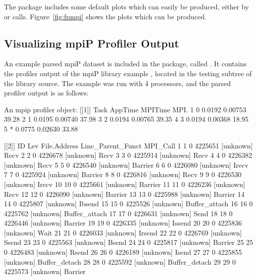 The package includes some default plots which can easily be produced, either by  or  calls.  Figure~\ref{fig:fpmpi} shows the plots which can be produced.


\subsection{Visualizing mpiP Profiler Output}

An example parsed mpiP dataset is included in the  package, called .  It contains the profiler output of the mpiP library example , located in the testing subtree of the library source.  The example was run with 4 processors, and the parsed profiler output is as follows:
\begin{Output}
An mpip profiler object:
[[1]]
  Task AppTime MPITime  MPI.
1    0  0.0192 0.00753 39.28
2    1  0.0195 0.00740 37.98
3    2  0.0194 0.00765 39.35
4    3  0.0194 0.00368 18.95
5    *  0.0775 0.02630 33.88

[[2]]
   ID Lev File.Address Line_Parent_Funct      MPI_Call
1   1   0      4225651         [unknown]          Recv
2   2   0      4226678         [unknown]          Recv
3   3   0      4225914         [unknown]          Recv
4   4   0      4226382         [unknown]          Recv
5   5   0      4226540         [unknown]       Barrier
6   6   0      4226080         [unknown]         Irecv
7   7   0      4225924         [unknown]       Barrier
8   8   0      4226816         [unknown]          Recv
9   9   0      4226530         [unknown]         Irecv
10 10   0      4225661         [unknown]       Barrier
11 11   0      4226236         [unknown]          Recv
12 12   0      4226090         [unknown]       Barrier
13 13   0      4225988         [unknown]       Barrier
14 14   0      4225807         [unknown]        Ibsend
15 15   0      4225526         [unknown] Buffer_attach
16 16   0      4225762         [unknown] Buffer_attach
17 17   0      4226631         [unknown]          Send
18 18   0      4226446         [unknown]       Barrier
19 19   0      4226335         [unknown]        Issend
20 20   0      4225836         [unknown]          Wait
21 21   0      4226033         [unknown]        Irsend
22 22   0      4226769         [unknown]         Ssend
23 23   0      4225563         [unknown]         Bsend
24 24   0      4225817         [unknown]       Barrier
25 25   0      4226483         [unknown]         Rsend
26 26   0      4226189         [unknown]         Isend
27 27   0      4225855         [unknown] Buffer_detach
28 28   0      4225592         [unknown] Buffer_detach
29 29   0      4225573         [unknown]       Barrier


\end{Output}
